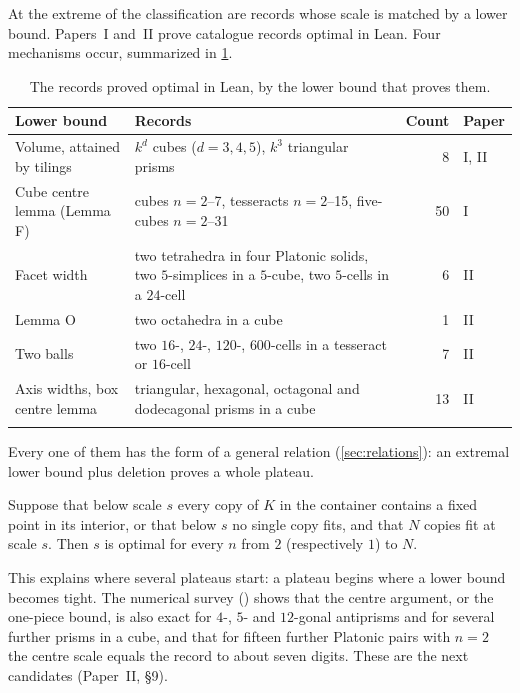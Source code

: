 \documentclass[11pt,a4paper]{article}
\begin{document}
At the extreme of the classification are records whose scale is matched by a lower bound. Papers~I and~II prove \nProven{} catalogue records optimal in Lean. Four mechanisms occur, summarized in \cref{tab:extremal}.

\begin{table}[htbp]
\centering\small
\begin{tabularx}{\textwidth}{>{\raggedright}p{3.3cm} >{\raggedright}X r l}
\toprule
Lower bound & Records & Count & Paper \\
\midrule
Volume, attained by tilings & $k^d$ cubes ($d=3,4,5$), $k^3$ triangular prisms & 8 & I, II \\
Cube centre lemma (Lemma F) & cubes $n=2$--7, tesseracts $n=2$--15, five-cubes $n=2$--31 & 50 & I \\
Facet width & two tetrahedra in four Platonic solids, two $5$-simplices in a $5$-cube, two $5$-cells in a $24$-cell & 6 & II \\
Lemma O & two octahedra in a cube & 1 & II \\
Two balls & two $16$-, $24$-, $120$-, $600$-cells in a tesseract or $16$-cell & 7 & II \\
Axis widths, box centre lemma & triangular, hexagonal, octagonal and dodecagonal prisms in a cube & 13 & II \\
\midrule
 & & \nProven{} & \\
\bottomrule
\end{tabularx}
\caption{The records proved optimal in Lean, by the lower bound that proves them.}
\label{tab:extremal}
\end{table}

Every one of them has the form of a general relation (\cref{sec:relations}): an extremal lower bound plus deletion proves a whole plateau.

\begin{theorem}
Suppose that below scale $s$ every copy of $K$ in the container contains a fixed point in its interior, or that below $s$ no single copy fits, and that $N$ copies fit at scale $s$. Then $s$ is optimal for every $n$ from $2$ (respectively $1$) to $N$.
\end{theorem}

This explains where several plateaus start: a plateau begins where a lower bound becomes tight. The numerical survey () shows that the centre argument, or the one-piece bound, is also exact for $4$-, $5$- and $12$-gonal antiprisms and for several further prisms in a cube, and that for fifteen further Platonic pairs with $n=2$ the centre scale equals the record to about seven digits. These are the next candidates (Paper~II, \S9).
\end{document}

